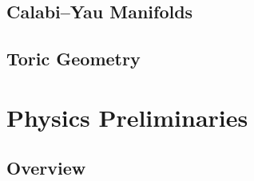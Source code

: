 \documentclass{report}
\theoremstyle{plain}
\theoremstyle{definition}
\theoremstyle{remark}
\begin{document}
\section{Calabi--Yau Manifolds}

\section{Toric Geometry}

\chapter{Physics Preliminaries}
\section{Overview}
\end{document}
